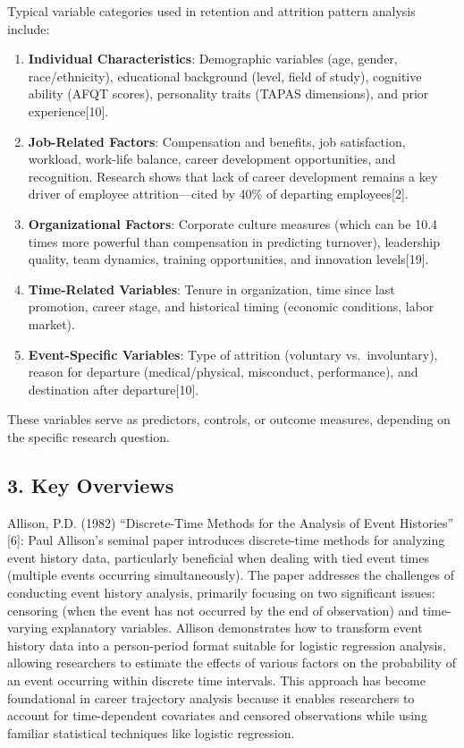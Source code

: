 \documentclass[
  letterpaper,
  DIV=11,
  numbers=noendperiod]{scrartcl}
\begin{document}
Typical variable categories used in retention and attrition pattern
analysis include:

\begin{enumerate}
\def\labelenumi{\arabic{enumi}.}
\item
  \textbf{Individual Characteristics}: Demographic variables (age,
  gender, race/ethnicity), educational background (level, field of
  study), cognitive ability (AFQT scores), personality traits (TAPAS
  dimensions), and prior experience{[}10{]}.
\item
  \textbf{Job-Related Factors}: Compensation and benefits, job
  satisfaction, workload, work-life balance, career development
  opportunities, and recognition. Research shows that lack of career
  development remains a key driver of employee attrition---cited by 40\%
  of departing employees{[}2{]}.
\item
  \textbf{Organizational Factors}: Corporate culture measures (which can
  be 10.4 times more powerful than compensation in predicting turnover),
  leadership quality, team dynamics, training opportunities, and
  innovation levels{[}19{]}.
\item
  \textbf{Time-Related Variables}: Tenure in organization, time since
  last promotion, career stage, and historical timing (economic
  conditions, labor market).
\item
  \textbf{Event-Specific Variables}: Type of attrition (voluntary
  vs.~involuntary), reason for departure (medical/physical, misconduct,
  performance), and destination after departure{[}10{]}.
\end{enumerate}

These variables serve as predictors, controls, or outcome measures,
depending on the specific research question.

\subsection{3. Key Overviews}\label{key-overviews}

Allison, P.D. (1982) ``Discrete-Time Methods for the Analysis of Event
Histories'' {[}6{]}: Paul Allison's seminal paper introduces
discrete-time methods for analyzing event history data, particularly
beneficial when dealing with tied event times (multiple events occurring
simultaneously). The paper addresses the challenges of conducting event
history analysis, primarily focusing on two significant issues:
censoring (when the event has not occurred by the end of observation)
and time-varying explanatory variables. Allison demonstrates how to
transform event history data into a person-period format suitable for
logistic regression analysis, allowing researchers to estimate the
effects of various factors on the probability of an event occurring
within discrete time intervals. This approach has become foundational in
career trajectory analysis because it enables researchers to account for
time-dependent covariates and censored observations while using familiar
statistical techniques like logistic regression.
\end{document}
